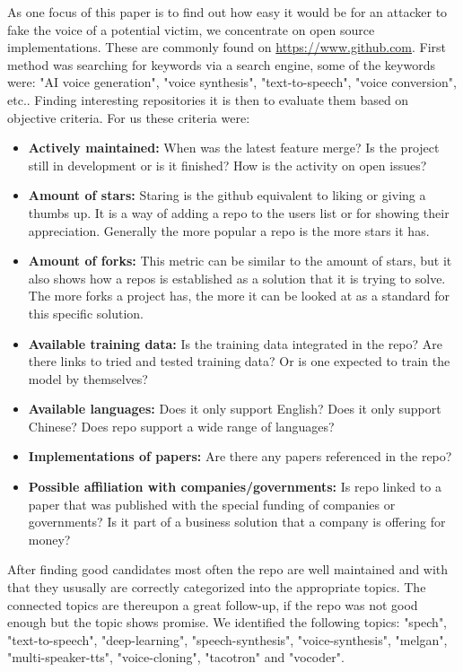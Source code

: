 As one focus of this paper is to find out how easy it would be for an attacker to fake the voice of a potential victim, we concentrate on open source implementations. These are commonly found on \url{https://www.github.com}. First method was searching for keywords via a search engine, some of the keywords were: "AI voice generation", "voice synthesis", "text-to-speech", "voice conversion", etc.. Finding interesting repositories it is then to evaluate them based on objective criteria. For us these criteria were:
\begin{itemize}
    \item \textbf{Actively maintained:} When was the latest feature merge? Is the project still in development or is it finished? How is the activity on open issues?
    \item \textbf{Amount of stars:} Staring is the github equivalent to liking or giving a thumbs up. It is a way of adding a \gls{repo} to the users list or for showing their appreciation. Generally the more popular a \gls{repo} is the more stars it has.
    \item \textbf{Amount of forks:} This metric can be similar to the amount of stars, but it also shows how a \gls{repo}s is established as a solution that it is trying to solve. The more forks a project has, the more it can be looked at as a standard for this specific solution.
    \item \textbf{Available training data:} Is the training data integrated in the \gls{repo}? Are there links to tried and tested training data? Or is one expected to train the model by themselves?
    \item \textbf{Available languages:} Does it only support English? Does it only support Chinese? Does \gls{repo} support a wide range of languages?
    \item \textbf{Implementations of papers:} Are there any papers referenced in the \gls{repo}?
    \item \textbf{Possible affiliation with companies/governments:} Is \gls{repo} linked to a paper that was published with the special funding of companies or governments? Is it part of a business solution that a company is offering for money?
\end{itemize}

After finding good candidates most often the \gls{repo} are well maintained and with that they ususally are correctly categorized into the appropriate topics. The connected topics are thereupon a great follow-up, if the \gls{repo} was not good enough but the topic shows promise. We identified the following topics: "spech", "text-to-speech", "deep-learning", "speech-synthesis", "voice-synthesis", "melgan", "multi-speaker-tts", "voice-cloning", "tacotron" and "vocoder".

